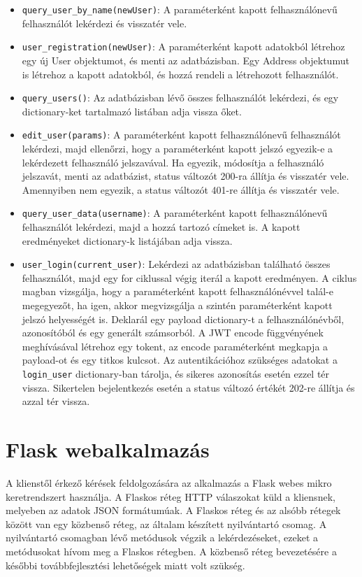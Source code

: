 \begin{itemize}
    \item \texttt{query\_user\_by\_name(newUser)}:
A paraméterként kapott felhasználónevű felhasználót lekérdezi és visszatér vele.
\item \texttt{user\_registration(newUser)}:
A paraméterként kapott adatokból létrehoz egy új User objektumot, és menti az adatbázisban. Egy Address objektumut is létrehoz a kapott adatokból, és hozzá rendeli a létrehozott felhasználót. 
\item \texttt{query\_users()}:
Az adatbázisban lévő összes felhasználót lekérdezi, és egy dictionary-ket tartalmazó listában adja vissza őket.
\item \texttt{edit\_user(params)}:
A paraméterként kapott felhasználónevű felhasználót lekérdezi, majd ellenőrzi, hogy a paraméterként kapott jelszó egyezik-e a lekérdezett felhasználó jelszavával. Ha egyezik, módosítja a felhasználó jelszavát, menti az adatbázist, status változót 200-ra állítja és visszatér vele. Amennyiben nem egyezik, a status változót 401-re állítja és visszatér vele.
\item \texttt{query\_user\_data(username)}:
A paraméterként kapott felhasználónevű felhasználót lekérdezi, majd a hozzá tartozó címeket is. A kapott eredményeket dictionary-k listájában adja vissza.
\item \texttt{user\_login(current\_user)}:
Lekérdezi az adatbázisban található összes felhasználót, majd egy for ciklussal végig iterál a kapott eredményen. A ciklus magban vizsgálja, hogy a paraméterként kapott felhasználónévvel talál-e megegyezőt, ha igen, akkor megvizsgálja a szintén paraméterként kapott jelszó helyességét is. Deklarál egy payload dictionary-t a felhasználónévből, azonosítóból és egy generált számsorból. A JWT encode függvényének meghívásával létrehoz egy tokent, az encode paraméterként megkapja a payload-ot és egy titkos kulcsot. Az autentikációhoz szükséges adatokat a \texttt{login\_user} dictionary-ban tárolja, és sikeres azonosítás esetén ezzel tér vissza. Sikertelen bejelentkezés esetén a status változó értékét 202-re állítja és azzal tér vissza.
\end{itemize}

\section{Flask webalkalmazás}

A klienstől érkező kérések feldolgozására az alkalmazás a Flask webes mikro keretrendszert használja. A Flaskos réteg HTTP válaszokat küld a kliensnek, melyeben az adatok JSON formátumúak. A Flaskos réteg és az alsóbb rétegek között van egy közbenső réteg, az általam készített nyilvántartó csomag. A nyilvántartó csomagban lévő metódusok végzik a lekérdezéseket, ezeket a metódusokat hívom meg a Flaskos rétegben. A közbenső réteg bevezetésére a későbbi továbbfejlesztési lehetőségek miatt volt szükség.

